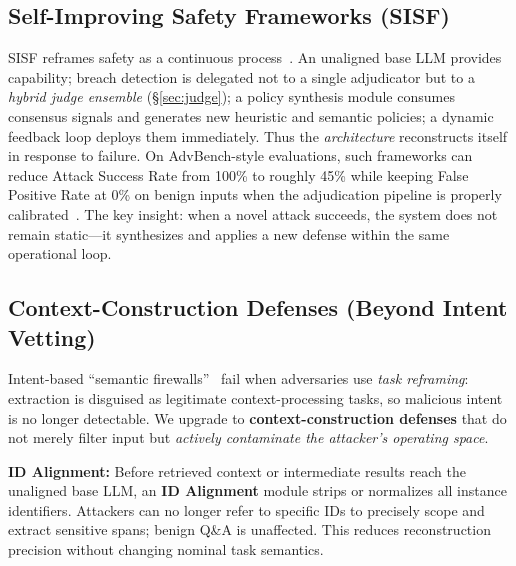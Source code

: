 \documentclass[letterpaper,twocolumn,10pt]{article}
\begin{document}
\subsection{Self-Improving Safety Frameworks (SISF)}

SISF reframes safety as a continuous process~\cite{sisf-arxiv}. An unaligned base LLM provides capability; breach detection is delegated not to a single adjudicator but to a \emph{hybrid judge ensemble} (\S\ref{sec:judge}); a policy synthesis module consumes consensus signals and generates new heuristic and semantic policies; a dynamic feedback loop deploys them immediately. Thus the \emph{architecture} reconstructs itself in response to failure. On AdvBench-style evaluations, such frameworks can reduce Attack Success Rate from 100\% to roughly 45\% while keeping False Positive Rate at 0\% on benign inputs when the adjudication pipeline is properly calibrated~\cite{sisf-arxiv}. The key insight: when a novel attack succeeds, the system does not remain static---it synthesizes and applies a new defense within the same operational loop.

\subsection{Context-Construction Defenses (Beyond Intent Vetting)}

Intent-based ``semantic firewalls''~\cite{agentos-arxiv} fail when adversaries use \emph{task reframing}: extraction is disguised as legitimate context-processing tasks, so malicious intent is no longer detectable. We upgrade to \textbf{context-construction defenses} that do not merely filter input but \emph{actively contaminate the attacker's operating space}.

\textbf{ID Alignment:} Before retrieved context or intermediate results reach the unaligned base LLM, an \textbf{ID Alignment} module strips or normalizes all instance identifiers. Attackers can no longer refer to specific IDs to precisely scope and extract sensitive spans; benign Q\&A is unaffected. This reduces reconstruction precision without changing nominal task semantics.
\end{document}
